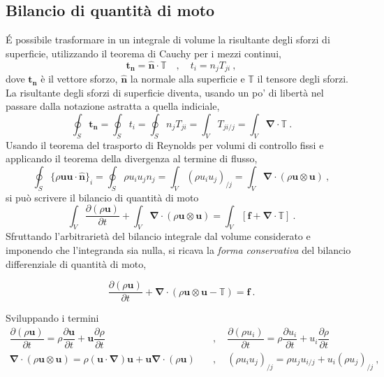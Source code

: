 \subsection{Bilancio di quantità di moto}
\'E possibile trasformare in un integrale di volume la risultante degli sforzi di superficie, utilizzando il teorema di Cauchy per i mezzi continui, 
\begin{equation}
  \bm{t_n} = \bm{\hat{n}} \cdot \mathbb{T} \quad , \quad 
  t_i = n_j T_{ji} \ ,
\end{equation}
dove $\bm{t_n}$ è il vettore sforzo, $\bm{\hat{n}}$ la normale alla superficie e $\mathbb{T}$ il tensore degli sforzi.
La risultante degli sforzi di superficie diventa, usando un po' di libertà nel passare dalla notazione astratta a quella indiciale,
\begin{equation}
 \oint_S \bm{t_n} = \oint_S t_i = \oint_S n_j T_{ji} =
  \int_V T_{ji/j} = \int_V \bm{\nabla} \cdot \mathbb{T} \ .
\end{equation}
Usando il teorema del trasporto di Reynolds per volumi di controllo fissi e applicando il teorema della divergenza al termine di flusso,
\begin{equation}
 \oint_S \big\{ \rho \bm{u} \bm{u} \cdot \bm{\hat{n}} \big\}_i = \oint_S \rho u_i u_j n_j = \int_V (\rho u_i u_j)_{/j} = \int_{V} \bm{\nabla} \cdot ( \rho \bm{u} \otimes \bm{u} ) \ ,
\end{equation}
si può scrivere il bilancio di quantità di moto 
\begin{equation}
  \displaystyle\int_{V} \dfrac{\partial(\rho \bm{u})}{\partial t}  + \int_{V} \bm{\nabla} \cdot ( \rho \bm{u} \otimes \bm{u} ) = \int_{V} \left[ \bm{f} +  \bm{\nabla} \cdot \mathbb{T} \right] \ .
\end{equation}
Sfruttando l'arbitrarietà del bilancio integrale dal volume considerato e imponendo che l'integranda sia nulla, si ricava la \textit{forma conservativa} del bilancio differenziale di quantità di moto,
\begin{fBox}
\begin{equation}
 \dfrac{\partial(\rho \bm{u})}{\partial t}  + \bm{\nabla} \cdot ( \rho \bm{u} \otimes \bm{u} - \mathbb{T} ) = \bm{f} \ .
\end{equation}
\end{fBox}
Sviluppando i termini 
\begin{equation}
\begin{aligned}
 \dfrac{\partial (\rho \bm{u})}{\partial t} = \rho \dfrac{\partial \bm{u}}{\partial t} + \bm{u} \dfrac{\partial \rho}{\partial t} \quad & , \quad 
 \dfrac{\partial (\rho u_i)}{\partial t} = \rho \dfrac{\partial u_i}{\partial t} + u_i \dfrac{\partial \rho}{\partial t} \\
 \bm{\nabla} \cdot ( \rho \bm{u} \otimes \bm{u} ) = \rho (\bm{u} \cdot \bm{\nabla}) \bm{u} + \bm{u} \bm{\nabla} \cdot (\rho \bm{u}) \quad & , \quad 
 ( \rho u_i u_j )_{/j} = \rho u_j u_{i/j} + u_i (\rho u_j)_{/j} 
  \ ,
\end{aligned}
\end{equation} 

